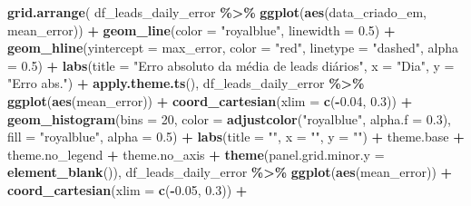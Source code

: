 \documentclass[
]{article}
\newenvironment{Shaded}{\begin{snugshade}}{\end{snugshade}}
\newcommand{\AttributeTok}[1]{\textcolor[rgb]{0.13,0.29,0.53}{#1}}
\newcommand{\DecValTok}[1]{\textcolor[rgb]{0.00,0.00,0.81}{#1}}
\newcommand{\FloatTok}[1]{\textcolor[rgb]{0.00,0.00,0.81}{#1}}
\newcommand{\FunctionTok}[1]{\textcolor[rgb]{0.13,0.29,0.53}{\textbf{#1}}}
\newcommand{\NormalTok}[1]{#1}
\newcommand{\SpecialCharTok}[1]{\textcolor[rgb]{0.81,0.36,0.00}{\textbf{#1}}}
\newcommand{\StringTok}[1]{\textcolor[rgb]{0.31,0.60,0.02}{#1}}
\begin{document}
\begin{Shaded}
\begin{Highlighting}[]
\FunctionTok{grid.arrange}\NormalTok{(}
\NormalTok{  df\_leads\_daily\_error }\SpecialCharTok{\%\textgreater{}\%}
    \FunctionTok{ggplot}\NormalTok{(}\FunctionTok{aes}\NormalTok{(data\_criado\_em, mean\_error)) }\SpecialCharTok{+}
    \FunctionTok{geom\_line}\NormalTok{(}\AttributeTok{color =} \StringTok{"royalblue"}\NormalTok{, }\AttributeTok{linewidth =} \FloatTok{0.5}\NormalTok{) }\SpecialCharTok{+}
    \FunctionTok{geom\_hline}\NormalTok{(}\AttributeTok{yintercept =}\NormalTok{ max\_error, }\AttributeTok{color =} \StringTok{"red"}\NormalTok{, }\AttributeTok{linetype =} \StringTok{"dashed"}\NormalTok{, }\AttributeTok{alpha =} \FloatTok{0.5}\NormalTok{) }\SpecialCharTok{+}
    \FunctionTok{labs}\NormalTok{(}\AttributeTok{title =} \StringTok{"Erro absoluto da média de leads diários"}\NormalTok{,}
         \AttributeTok{x =} \StringTok{"Dia"}\NormalTok{,}
         \AttributeTok{y =} \StringTok{"Erro abs."}\NormalTok{) }\SpecialCharTok{+}
    \FunctionTok{apply.theme.ts}\NormalTok{(),}
\NormalTok{  df\_leads\_daily\_error }\SpecialCharTok{\%\textgreater{}\%}
    \FunctionTok{ggplot}\NormalTok{(}\FunctionTok{aes}\NormalTok{(mean\_error)) }\SpecialCharTok{+}
    \FunctionTok{coord\_cartesian}\NormalTok{(}\AttributeTok{xlim =} \FunctionTok{c}\NormalTok{(}\SpecialCharTok{{-}}\FloatTok{0.04}\NormalTok{, }\FloatTok{0.3}\NormalTok{)) }\SpecialCharTok{+}
    \FunctionTok{geom\_histogram}\NormalTok{(}\AttributeTok{bins =} \DecValTok{20}\NormalTok{, }\AttributeTok{color =} \FunctionTok{adjustcolor}\NormalTok{(}\StringTok{"royalblue"}\NormalTok{, }\AttributeTok{alpha.f =} \FloatTok{0.3}\NormalTok{), }\AttributeTok{fill =} \StringTok{"royalblue"}\NormalTok{, }\AttributeTok{alpha =} \FloatTok{0.5}\NormalTok{) }\SpecialCharTok{+}
    \FunctionTok{labs}\NormalTok{(}\AttributeTok{title =} \StringTok{""}\NormalTok{,}
         \AttributeTok{x =} \StringTok{""}\NormalTok{,}
         \AttributeTok{y =} \StringTok{""}\NormalTok{) }\SpecialCharTok{+}
\NormalTok{    theme.base }\SpecialCharTok{+}\NormalTok{ theme.no\_legend }\SpecialCharTok{+}\NormalTok{ theme.no\_axis }\SpecialCharTok{+}
    \FunctionTok{theme}\NormalTok{(}\AttributeTok{panel.grid.minor.y =} \FunctionTok{element\_blank}\NormalTok{()),}
\NormalTok{  df\_leads\_daily\_error }\SpecialCharTok{\%\textgreater{}\%}
    \FunctionTok{ggplot}\NormalTok{(}\FunctionTok{aes}\NormalTok{(mean\_error)) }\SpecialCharTok{+}
    \FunctionTok{coord\_cartesian}\NormalTok{(}\AttributeTok{xlim =} \FunctionTok{c}\NormalTok{(}\SpecialCharTok{{-}}\FloatTok{0.05}\NormalTok{, }\FloatTok{0.3}\NormalTok{)) }\SpecialCharTok{+}

\end{Highlighting}
\end{Shaded}
\end{document}
